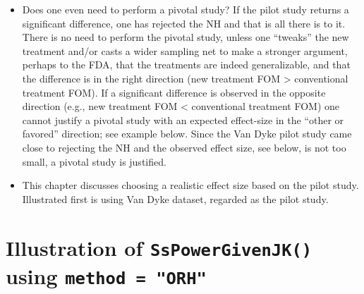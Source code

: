 \documentclass[
]{book}
\newenvironment{Shaded}{\begin{snugshade}}{\end{snugshade}}
\newcommand{\CommentTok}[1]{\textcolor[rgb]{0.56,0.35,0.01}{\textit{#1}}}
\newcommand{\DataTypeTok}[1]{\textcolor[rgb]{0.13,0.29,0.53}{#1}}
\newcommand{\KeywordTok}[1]{\textcolor[rgb]{0.13,0.29,0.53}{\textbf{#1}}}
\newcommand{\NormalTok}[1]{#1}
\newcommand{\OperatorTok}[1]{\textcolor[rgb]{0.81,0.36,0.00}{\textbf{#1}}}
\newcommand{\StringTok}[1]{\textcolor[rgb]{0.31,0.60,0.02}{#1}}
\begin{document}
\begin{itemize}
\item
  Does one even need to perform a pivotal study? If the pilot study returns a significant difference, one has rejected the NH and that is all there is to it. There is no need to perform the pivotal study, unless one ``tweaks'' the new treatment and/or casts a wider sampling net to make a stronger argument, perhaps to the FDA, that the treatments are indeed generalizable, and that the difference is in the right direction (new treatment FOM \textgreater{} conventional treatment FOM). If a significant difference is observed in the opposite direction (e.g., new treatment FOM \textless{} conventional treatment FOM) one cannot justify a pivotal study with an expected effect-size in the ``other or favored'' direction; see example below. Since the Van Dyke pilot study came close to rejecting the NH and the observed effect size, see below, is not too small, a pivotal study is justified.
\item
  This chapter discusses choosing a realistic effect size based on the pilot study. Illustrated first is using Van Dyke dataset, regarded as the pilot study.
\end{itemize}

\hypertarget{illustration-of-sspowergivenjk-using-method-orh-1}{%
\section{\texorpdfstring{Illustration of \texttt{SsPowerGivenJK()} using \texttt{method\ =\ "ORH"}}{Illustration of SsPowerGivenJK() using method = "ORH"}}\label{illustration-of-sspowergivenjk-using-method-orh-1}}

\begin{Shaded}
\end{Shaded}
\end{document}

